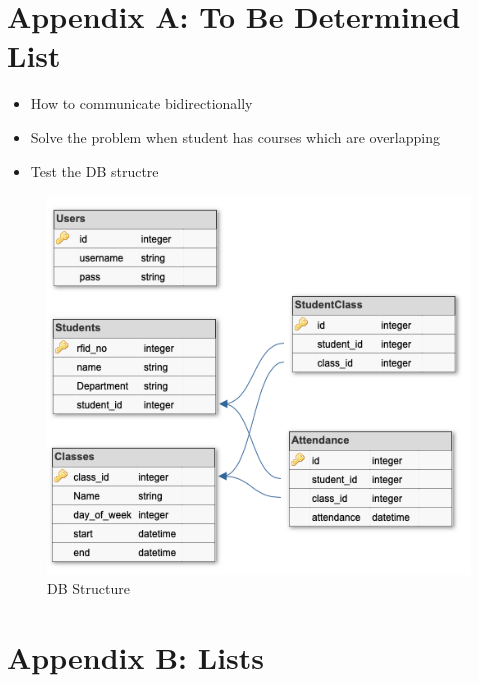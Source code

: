 \documentclass{scrreprt}
\begin{document}
\section{Appendix A: To Be Determined List}
\begin{itemize}
  \item How to communicate bidirectionally
  \item Solve the problem when student has courses which are overlapping
  \item Test the DB structre
\end{itemize}
\begin{figure}[H]
 \begin{center}
	\includegraphics[scale=0.5]{db.png}
  	\caption{DB Structure}
  \end{center}
\end{figure}
\section{Appendix B: Lists}
\listoffigures
\listoftables
\end{document}
